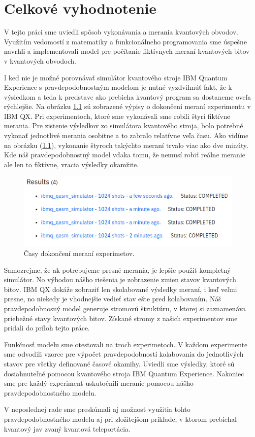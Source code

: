 
\chapter{Celkové vyhodnotenie}

V tejto práci sme uviedli spôsob vykonávania a merania kvantových obvodov.
Využitím vedomostí z matematiky a funkcionálneho programovania sme úspešne 
navrhli a implementovali model pre počítanie fiktívnych meraní kvantových
bitov v kvantových obvodoch.

I keď nie je možné porovnávať simulátor kvantového stroje IBM Quantum
Experience s pravdepodobnostným modelom je nutné vyzdvihnúť fakt, že k
výsledkom a teda k predstave ako prebieha kvantový program sa dostaneme 
oveľa rýchlejšie. Na obrázku \ref{expr_time} sú zobrazené výpisy o dokončení
meraní experimentu v IBM QX. Pri experimentoch, ktoré sme vykonávali sme 
robili štyri fiktívne merania. Pre zistenie výsledkov zo simulátora kvantového
stroja, bolo potrebné vykonať jednotlivé merania osobitne a to zabralo relatívne
veľa času. Ako vidíme na obrázku (\ref{expr_time}), vykonanie štyroch 
takýchto meraní trvalo viac ako dve minúty. Kde náš pravdepodobnostný model
vďaka tomu, že nemusí robiť reálne meranie ale len to fiktívne, vracia 
výsledky okamžite. 

\begin{figure}
	\centering 
	\includegraphics[width=.8\textwidth]{figures/time_expr.png} 
	\caption{Časy dokončení meraní experimetov.}
    \label{expr_time}
\end{figure}


Samozrejme, že ak potrebujeme presné merania, je lepšie použiť kompletný
simulátor. No výhodou nášho riešenia je zobrazenie zmien stavov kvantových
bitov. IBM QX dokáže zobraziť len skolabované výsledky meraní, i keď veľmi
presne, no niekedy je vhodnejšie vedieť stav ešte pred kolabovaním. Náš 
pravdepodobnosný model generuje stromovú štruktúru, v ktorej si zaznamenáva
priebežné stavy kvantových bitov. Získané stromy z našich experimentov sme 
pridali do príloh tejto práce.

Funkčnosť modelu sme otestovali na troch experimetoch. V každom experimente 
sme odvodili vzorce pre výpočet pravdepodobností kolabovania do jednotlivých
stavov pre všetky definované časové okamihy. Uviedli sme výsledky, ktoré 
sú dosiahnuteľné pomocou kvantového stroja IBM Quantum Experience. Nakoniec 
sme pre každý experiment uskutočnili meranie pomocou nášho pravdepodobnostného
modelu.

V neposlednej rade sme preskúmali aj možnosť využitia tohto pravdepodobnostného
modelu aj pri zložitejšom príklade, v ktorom prebiehal kvantový jav zvaný
kvantová teleportácia.
